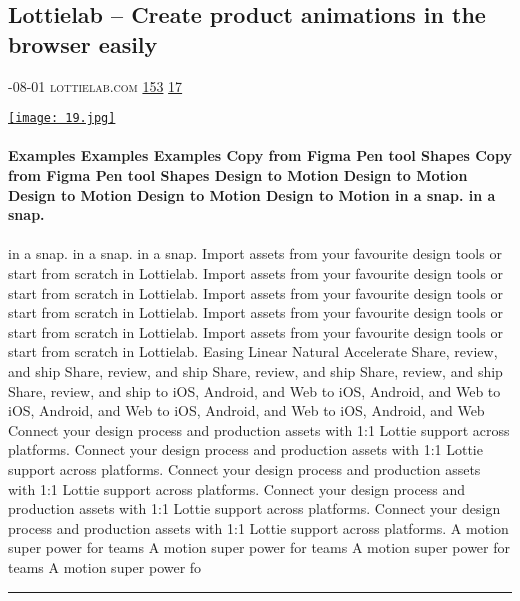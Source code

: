 \documentclass[10pt,a4paper]{article}
\begin{document}
\begin{multicols}{2}
\begin{minipage}{\linewidth}
\subsection{Lottielab – Create product animations in the browser easily}
\textsc{\footnotesize
{\scriptsize\faCalendar}-08-01 
{\scriptsize\faGlobe}\space 
lottielab.com 
{\scriptsize\faThumbsOUp}\space 
\href{http://news.ycombinator.com/item?id=37133128\&utm\_term=comment}{153} 
{\scriptsize\faComments}\space 
\href{http://news.ycombinator.com/item?id=37133128\&utm\_term=comment}{17} 
}
\par\medskip\noindent
\href{https://www.lottielab.com/?utm\_source=hackernewsletter\&utm\_medium=email\&utm\_term=show\_hn}{
    \texttt{[image: 19.jpg]}
}
\end{minipage}
\paragraph{}
\textbf{Examples
Examples
Examples
Copy from Figma
Pen tool
Shapes
Copy from Figma
Pen tool
Shapes
Design to Motion
Design to Motion
Design to Motion
Design to Motion
Design to Motion
in a snap.
in a snap.}
\paragraph{}

in a snap.
in a snap.
in a snap.
Import assets from your favourite design tools or start from scratch in Lottielab.
Import assets from your favourite design tools or start from scratch in Lottielab.
Import assets from your favourite design tools or start from scratch in Lottielab.
Import assets from your favourite design tools or start from scratch in Lottielab.
Import assets from your favourite design tools or start from scratch in Lottielab.
Easing
Linear
Natural
Accelerate
Share, review, and ship
Share, review, and ship
Share, review, and ship
Share, review, and ship
Share, review, and ship
to iOS, Android, and Web
to iOS, Android, and Web
to iOS, Android, and Web
to iOS, Android, and Web
to iOS, Android, and Web
Connect your design process and production assets with 1:1 Lottie support across platforms.
Connect your design process and production assets with 1:1 Lottie support across platforms.
Connect your design process and production assets with 1:1 Lottie support across platforms.
Connect your design process and production assets with 1:1 Lottie support across platforms.
Connect your design process and production assets with 1:1 Lottie support across platforms.
A motion super power for teams
A motion super power for teams
A motion super power for teams
A motion super power fo
\par\noindent\textcolor{red}{\rule{\linewidth}{0.2mm}}
\vfill
\null
\noindent\begin{minipage}{\linewidth}

\end{minipage}
\end{multicols}
\end{document}
